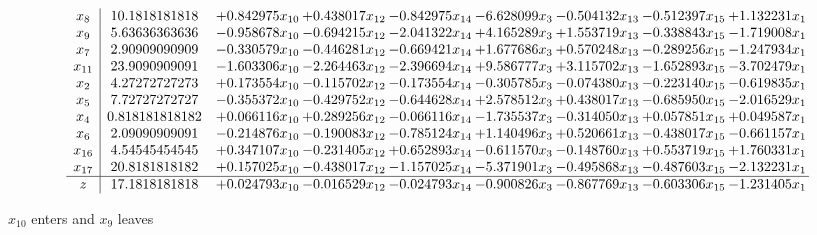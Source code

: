 \documentclass[10pt]{article}
\begin{document}
 \[\begin{array}{c| c c@{\hskip 2pt} c@{\hskip 2pt} c@{\hskip 2pt} c@{\hskip 2pt} c@{\hskip 2pt} c@{\hskip 2pt} c@{\hskip 2pt} }
 x_{8}   &  10.1818181818 & + 0.842975 x_{10} & + 0.438017 x_{12} & -0.842975 x_{14} & -6.628099 x_{3} & -0.504132 x_{13} & -0.512397 x_{15} & + 1.132231 x_{1}\\
 x_{9}   &  5.63636363636 & -0.958678 x_{10} & -0.694215 x_{12} & -2.041322 x_{14} & + 4.165289 x_{3} & + 1.553719 x_{13} & -0.338843 x_{15} & -1.719008 x_{1}\\
 x_{7}   &  2.90909090909 & -0.330579 x_{10} & -0.446281 x_{12} & -0.669421 x_{14} & + 1.677686 x_{3} & + 0.570248 x_{13} & -0.289256 x_{15} & -1.247934 x_{1}\\
 x_{11}   &  23.9090909091 & -1.603306 x_{10} & -2.264463 x_{12} & -2.396694 x_{14} & + 9.586777 x_{3} & + 3.115702 x_{13} & -1.652893 x_{15} & -3.702479 x_{1}\\
 x_{2}   &  4.27272727273 & + 0.173554 x_{10} & -0.115702 x_{12} & -0.173554 x_{14} & -0.305785 x_{3} & -0.074380 x_{13} & -0.223140 x_{15} & -0.619835 x_{1}\\
 x_{5}   &  7.72727272727 & -0.355372 x_{10} & -0.429752 x_{12} & -0.644628 x_{14} & + 2.578512 x_{3} & + 0.438017 x_{13} & -0.685950 x_{15} & -2.016529 x_{1}\\
 x_{4}   &  0.818181818182 & + 0.066116 x_{10} & + 0.289256 x_{12} & -0.066116 x_{14} & -1.735537 x_{3} & -0.314050 x_{13} & + 0.057851 x_{15} & + 0.049587 x_{1}\\
 x_{6}   &  2.09090909091 & -0.214876 x_{10} & -0.190083 x_{12} & -0.785124 x_{14} & + 1.140496 x_{3} & + 0.520661 x_{13} & -0.438017 x_{15} & -0.661157 x_{1}\\
 x_{16}   &  4.54545454545 & + 0.347107 x_{10} & -0.231405 x_{12} & + 0.652893 x_{14} & -0.611570 x_{3} & -0.148760 x_{13} & + 0.553719 x_{15} & + 1.760331 x_{1}\\
 x_{17}   &  20.8181818182 & + 0.157025 x_{10} & -0.438017 x_{12} & -1.157025 x_{14} & -5.371901 x_{3} & -0.495868 x_{13} & -0.487603 x_{15} & -2.132231 x_{1}\\
\hline
z    &  17.1818181818 & + 0.024793 x_{10} & -0.016529 x_{12} & -0.024793 x_{14} & -0.900826 x_{3} & -0.867769 x_{13} & -0.603306 x_{15} & -1.231405 x_{1}\\
\end{array}\]


 $ x_{10} $ enters and $ x_{9} $ leaves 
\end{document}
